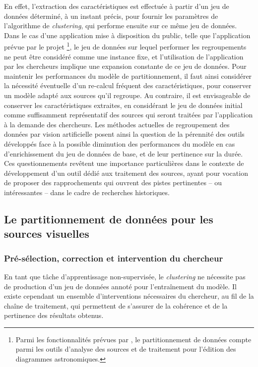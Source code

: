     En effet, l'extraction des caractéristiques est effectuée à partir d'un jeu de données déterminé, à un instant précis, pour fournir les paramètres de l'algorithme de \textit{clustering}, qui performe ensuite sur ce même jeu de données. Dans le cas d'une application mise à disposition du public, telle que l'application prévue par le projet \eida\footnote{Parmi les fonctionnalités prévues par \eida, le partitionnement de données compte parmi les outils d'analyse des sources et de traitement pour l'édition des diagrammes astronomiques.}, le jeu de données sur lequel performer les regroupements ne peut être considéré comme une instance fixe, et l'utilisation de l'application par les chercheurs implique une expansion constante de ce jeu de données. Pour maintenir les performances du modèle de partitionnement, il faut ainsi considérer la nécessité éventuelle d'un re-calcul fréquent des caractéristiques, pour conserver un modèle adapté aux sources qu'il regroupe. Au contraire, il est envisageable de conserver les caractéristiques extraites, en considérant le jeu de données initial comme suffisamment représentatif des sources qui seront traitées par l'application à la demande des chercheurs. Les méthodes actuelles de regroupement des données par vision artificielle posent ainsi la question de la pérennité des outils développés face à la possible diminution des performances du modèle en cas d'enrichissement du jeu de données de base, et de leur pertinence sur la durée. Ces questionnements revêtent une importance particulières dans le contexte de développement d'un outil dédié aux traitement des sources, ayant pour vocation de proposer des rapprochements qui ouvrent des pistes pertinentes -- ou intéressantes -- dans le cadre de recherches historiques.
    
\subsection{Le partitionnement de données pour les sources visuelles}
    \subsubsection{Pré-sélection, correction et intervention du chercheur}
    En tant que tâche d'apprentissage non-supervisée, le \textit{clustering} ne nécessite pas de production d'un jeu de données annoté pour l'entraînement du modèle. Il existe cependant un ensemble d'interventions nécessaires du chercheur, au fil de la chaîne de traitement, qui permettent de s'assurer de la cohérence et de la pertinence des résultats obtenus.
    
